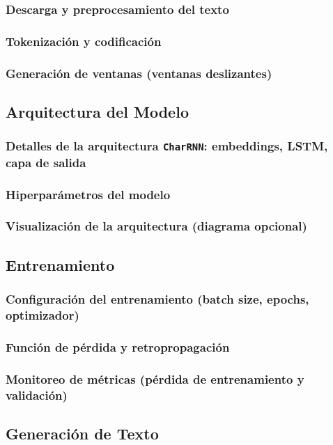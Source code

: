 \documentclass{article}
\begin{document}
\subsubsection{Descarga y preprocesamiento del texto}
\subsubsection{Tokenización y codificación}
\subsubsection{Generación de ventanas (ventanas deslizantes)}

\subsection{Arquitectura del Modelo}
\subsubsection{Detalles de la arquitectura \texttt{CharRNN}: embeddings, LSTM, capa de salida}
\subsubsection{Hiperparámetros del modelo}
\subsubsection{Visualización de la arquitectura (diagrama opcional)}

\subsection{Entrenamiento}
\subsubsection{Configuración del entrenamiento (batch size, epochs, optimizador)}
\subsubsection{Función de pérdida y retropropagación}
\subsubsection{Monitoreo de métricas (pérdida de entrenamiento y validación)}

\subsection{Generación de Texto}
\end{document}

